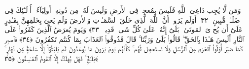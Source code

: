  وَمَن لَّا يُجِب دَاعِىَ ٱللَّهِ فَلَيسَ بِمُعجِزٍۢ فِى ٱلأَرضِ وَلَيسَ لَهُۥ مِن دُونِهِۦٓ أَولِيَآءُ ۚ أُو۟لَـٰٓئِكَ فِى ضَلَـٰلٍۢ مُّبِينٍ ﴿٣٢﴾
 أَوَلَم يَرَوا۟ أَنَّ ٱللَّهَ ٱلَّذِى خَلَقَ ٱلسَّمَـٰوَٟتِ وَٱلأَرضَ وَلَم يَعىَ بِخَلقِهِنَّ بِقَـٰدِرٍ عَلَىٰٓ أَن يُحۦِىَ ٱلمَوتَىٰ ۚ بَلَىٰٓ إِنَّهُۥ عَلَىٰ كُلِّ شَىءٍۢ قَدِيرٌۭ ﴿٣٣﴾
 وَيَومَ يُعرَضُ ٱلَّذِينَ كَفَرُوا۟ عَلَى ٱلنَّارِ أَلَيسَ هَـٰذَا بِٱلحَقِّ ۖ قَالُوا۟ بَلَىٰ وَرَبِّنَا ۚ قَالَ فَذُوقُوا۟ ٱلعَذَابَ بِمَا كُنتُم تَكفُرُونَ ﴿٣٤﴾
 فَٱصبِر كَمَا صَبَرَ أُو۟لُوا۟ ٱلعَزمِ مِنَ ٱلرُّسُلِ وَلَا تَستَعجِل لَّهُم ۚ كَأَنَّهُم يَومَ يَرَونَ مَا يُوعَدُونَ لَم يَلبَثُوٓا۟ إِلَّا سَاعَةًۭ مِّن نَّهَارٍۭ ۚ بَلَـٰغٌۭ ۚ فَهَل يُهلَكُ إِلَّا ٱلقَومُ ٱلفَـٰسِقُونَ ﴿٣٥﴾
 
